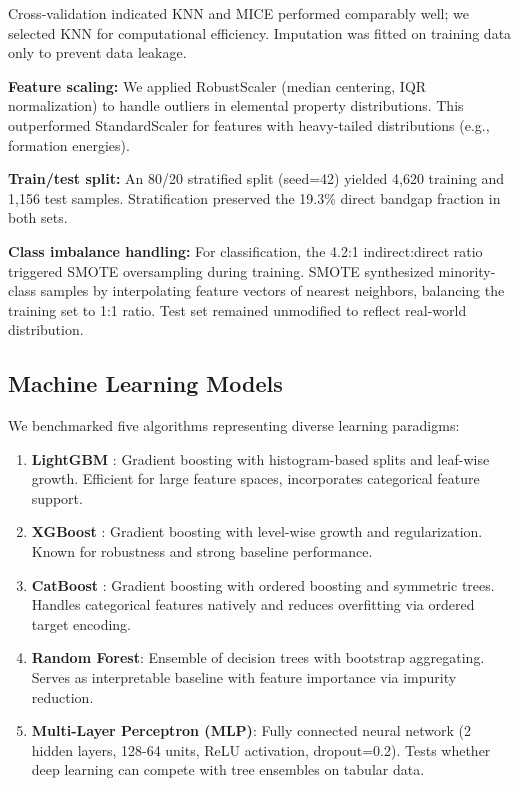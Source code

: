 \documentclass[conference]{IEEEtran}
\begin{document}
Cross-validation indicated KNN and MICE performed comparably well; we selected KNN for computational efficiency. Imputation was fitted on training data only to prevent data leakage.

\textbf{Feature scaling:} We applied RobustScaler (median centering, IQR normalization) to handle outliers in elemental property distributions. This outperformed StandardScaler for features with heavy-tailed distributions (e.g., formation energies).

\textbf{Train/test split:} An 80/20 stratified split (seed=42) yielded 4,620 training and 1,156 test samples. Stratification preserved the 19.3\% direct bandgap fraction in both sets.

\textbf{Class imbalance handling:} For classification, the 4.2:1 indirect:direct ratio triggered SMOTE oversampling during training. SMOTE synthesized minority-class samples by interpolating feature vectors of nearest neighbors, balancing the training set to 1:1 ratio. Test set remained unmodified to reflect real-world distribution.

\subsection{Machine Learning Models}
We benchmarked five algorithms representing diverse learning paradigms:

\begin{enumerate}
  \item \textbf{LightGBM} \cite{Ke2017LightGBM}: Gradient boosting with histogram-based splits and leaf-wise growth. Efficient for large feature spaces, incorporates categorical feature support.
  
  \item \textbf{XGBoost} \cite{Chen2016XGBoost}: Gradient boosting with level-wise growth and regularization. Known for robustness and strong baseline performance.
  
  \item \textbf{CatBoost} \cite{CatBoost2018}: Gradient boosting with ordered boosting and symmetric trees. Handles categorical features natively and reduces overfitting via ordered target encoding.
  
  \item \textbf{Random Forest}: Ensemble of decision trees with bootstrap aggregating. Serves as interpretable baseline with feature importance via impurity reduction.
  
  \item \textbf{Multi-Layer Perceptron (MLP)}: Fully connected neural network (2 hidden layers, 128-64 units, ReLU activation, dropout=0.2). Tests whether deep learning can compete with tree ensembles on tabular data.
\end{enumerate}
\end{document}
